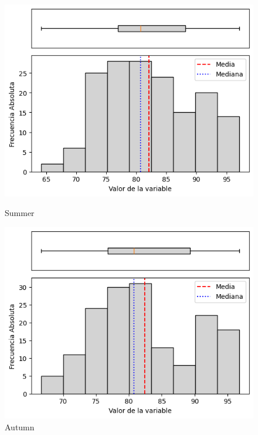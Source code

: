 \begin{figure}[htbp]
\centering
\begin{minipage}{0.30\textwidth}
  \includegraphics[width=\linewidth]{resultados/por_estacion_del_anio/boxplot_clases_por_estacion/Andahuaylas/RH_HistBoxplot_Summer.png}
  \caption*{Summer}
\end{minipage}
\hfill
\begin{minipage}{0.30\textwidth}
  \includegraphics[width=\linewidth]{resultados/por_estacion_del_anio/boxplot_clases_por_estacion/Andahuaylas/RH_HistBoxplot_Autumn.png}
  \caption*{Autumn}
\end{minipage}


\end{figure}
